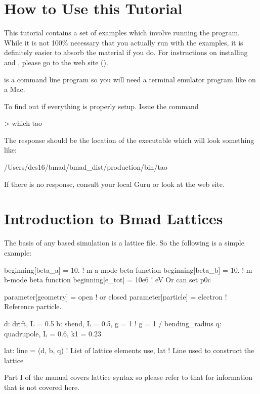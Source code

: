 \documentclass{hitec}
\newcommand{\Section}[1]{\section{#1}\vspace*{-1ex}}
\begin{document}
\Section{How to Use this Tutorial}

This tutorial contains a set of examples which involve running the \tao program. 
While it is not 100\% necessary that you actually run \tao with the examples, it is
definitely easier to absorb the material if you do. For instructions on installing \bmad
and \tao, please go to the \bmad web site ().

\tao is a command line program so you will need a terminal emulator program like  on a
Mac.

To find out if everything is properly setup. Issue the command
\begin{code}
> which tao
\end{code}
The response should be the location of the \tao executable which will look something like:
\begin{code}
/Users/dcs16/bmad/bmad_dist/production/bin/tao
\end{code}
If there is no response, consult your local \bmad Guru or look at the \bmad web site.

\Section{Introduction to Bmad Lattices}
\label{s:bmad.intro}

The basis of any \bmad based simulation is a lattice file. So the following is a
simple example:
\begin{code}
beginning[beta_a] = 10.   ! m  a-mode beta function
beginning[beta_b] = 10.   ! m  b-mode beta function
beginning[e_tot] = 10e6   ! eV   Or can set p0c

parameter[geometry] = open      ! or closed
parameter[particle] = electron  ! Reference particle.

d: drift, L = 0.5
b: sbend, L = 0.5, g = 1    ! g = 1 / bending_radius
q: quadrupole, L = 0.6, k1 = 0.23

lat: line = (d, b, q)   ! List of lattice elements
use, lat                ! Line used to construct the lattice
\end{code}
Part I of the \bmad manual covers lattice syntax so please refer to that for information that
is not covered here.
\end{document}
